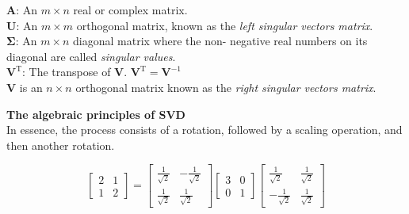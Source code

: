 \documentclass[a1paper,portrait,margin=0.8cm]{baposter}
\begin{document}
\begin{poster}
{\begin{minipage}[b]{0.5\textwidth}
$\mathbf{A}$: An $m \times n$ real or complex matrix. \\
$\mathbf{U}$: An $m \times m$ orthogonal matrix, known as the \emph{left singular vectors matrix}. \\
$\boldsymbol{\Sigma}$: An $m \times n$ diagonal matrix where the non- negative real numbers on its diagonal are called \emph{singular values}. \\
$\mathbf{V}^\text{T}$: The transpose of $\mathbf{V}$. $\mathbf{V}^\text{T} = \mathbf{V}^{-1}$ \\
$\mathbf{V}$ is an $n \times n$ orthogonal matrix  known as the \emph{right singular vectors matrix}.\\ 


\end{minipage}
\hfill
\begin{minipage}[b]{0.48\textwidth}

\noindent \textbf{The algebraic principles of SVD} \\
In essence, the process consists of a rotation, followed by a scaling operation, and then another rotation.

\vspace{-3em}
\setlength{\arraycolsep}{1.5pt}


\[
\!\begin{bmatrix} 2 & 1 \\ 1 & 2 \end{bmatrix} 
\!\!=\!\!
\begin{bmatrix} 
\frac{1}{\sqrt{2}} & -\frac{1}{\sqrt{2}} \\[5pt]
\frac{1}{\sqrt{2}} & \frac{1}{\sqrt{2}} 
\end{bmatrix}\!\!
\begin{bmatrix} 3 & 0 \\ 0 & 1 \end{bmatrix}\!\!
\begin{bmatrix}
\frac{1}{\sqrt{2}} & \frac{1}{\sqrt{2}} \\[5pt]
-\frac{1}{\sqrt{2}} & \frac{1}{\sqrt{2}} 
\end{bmatrix}
\]


\end{minipage}}
\end{poster}
\end{document}
